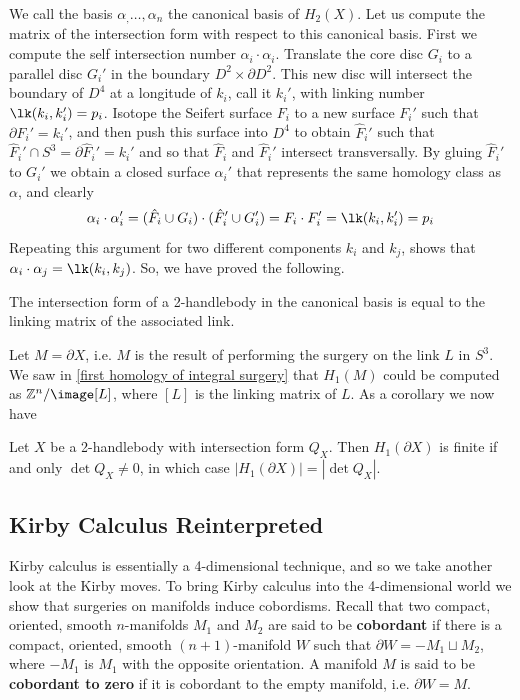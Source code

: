 We call the basis $\alpha_,\ldots,\alpha_n$ the canonical basis of $H_2(X)$. Let us compute the matrix of the intersection form with respect to this canonical basis. First we compute the self intersection number $\alpha_i \cdot \alpha_i$. Translate the core disc $G_i$ to a parallel disc $G_i'$ in the boundary $D^2 \times \partial D^2$. This new disc will intersect the boundary of $D^4$ at a longitude of $k_i$, call it $k_i'$, with linking number $\lk(k_i,k_i')=p_i$. Isotope the Seifert surface $F_i$ to a new surface $F_i'$ such that $\partial F_i' = k_i'$, and then push this surface into $D^4$ to obtain $\hat F_i'$ such that $\hat F_i' \cap S^3 = \partial \hat F_i' = k_i'$ and so that $\hat F_i$ and $\hat F_i'$ intersect transversally. By gluing $\hat F_i'$ to $G_i'$ we obtain a closed surface $\alpha_i'$ that represents the same homology class as $\alpha$, and clearly
\[ \alpha_i \cdot \alpha_i' = (\hat F_i \cup G_i) \cdot (\hat F_i' \cup G_i') = F_i \cdot F_i' = \lk(k_i,k_i') = p_i \]
Repeating this argument for two different components $k_i$ and $k_j$, shows that $\alpha_i \cdot \alpha_j = \lk(k_i,k_j)$. So, we have proved the following.
\begin{prop}
\label{intersection form = linking matrix}
The intersection form of a 2-handlebody in the canonical basis is equal to the linking matrix of the associated link.
\end{prop}

Let $M = \partial X$, i.e. $M$ is the result of performing the surgery on the link $L$ in $S^3$. We saw in \cref{first homology of integral surgery} that $H_1(M)$ could be computed as $\mathbb Z^n / \image [L]$, where $[L]$ is the linking matrix of $L$. As a corollary we now have
\begin{cor}
Let $X$ be a 2-handlebody with intersection form $Q_X$. Then $H_1(\partial X)$ is finite if and only $\det Q_X \neq 0$, in which case $|H_1(\partial X)| = |\det Q_X|$. 
\end{cor}







\subsection{Kirby Calculus Reinterpreted}
\label{Kirby Calculus Reinterpreted}


Kirby calculus is essentially a 4-dimensional technique, and so we take another look at the Kirby moves. To bring Kirby calculus into the 4-dimensional world we show that surgeries on manifolds induce cobordisms. Recall that two compact, oriented, smooth $n$-manifolds $M_1$ and $M_2$ are said to be \textbf{cobordant} if there is a compact, oriented, smooth $(n+1)$-manifold $W$ such that $\partial W = -M_1 \sqcup M_2$, where $-M_1$ is $M_1$ with the opposite orientation. A manifold $M$ is said to be \textbf{cobordant to zero} if it is cobordant to the empty manifold, i.e. $\partial W = M$.

